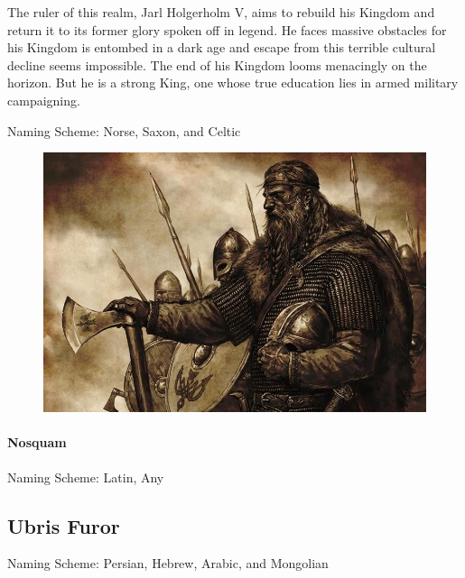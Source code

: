 \begin{multicols}{2}
The ruler of this realm, Jarl Holgerholm V, aims to rebuild his Kingdom and return it to its former glory spoken off in legend. He faces massive obstacles for his Kingdom is entombed in a dark age and escape from this terrible cultural decline seems impossible. The end of his Kingdom looms menacingly on the horizon. But he is a strong King, one whose true education lies in armed military campaigning. 

Naming Scheme: Norse, Saxon, and Celtic

\begin{figure}[t]
    \includegraphics[width=\columnwidth]{viking1}
\end{figure}

\paragraph{Nosquam}

Naming Scheme: Latin, Any

\subsection{Ubris Furor}

Naming Scheme: Persian, Hebrew, Arabic, and Mongolian




\end{multicols}
